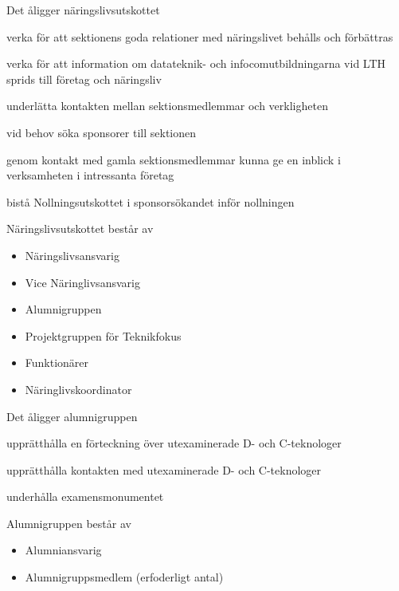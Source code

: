 \documentclass[pdfbookmarks,a4paper,11pt]{article}
\newlength{\itemcollength}
\newenvironment{reglemlista}{%
  \begin{list}{}{%
      \setlength{\labelwidth}{\itemcollength}%
      \setlength{\leftmargin}{\labelwidth + \labelsep}%
      \renewcommand{\makelabel}[1]{%
        \raisebox{0pt}[1ex][0pt]{%
          \makebox[\labelwidth][l]{%
            \parbox[t]{\itemcollength}{%
              \raggedright\hspace{0pt}##1}}}\hfill}%
      }}{%
  \end{list}}
\begin{document}
\begin{reglemlista}

	\item[Åligganden]
	Det åligger näringslivsutskottet
	\begin{attlista}
		\item verka för att sektionens goda relationer med näringslivet behålls och förbättras
		\item verka för att information om datateknik- och infocomutbildningarna vid LTH sprids till företag och näringsliv
		\item underlätta kontakten mellan sektionsmedlemmar och verkligheten
		\item vid behov söka sponsorer till sektionen
		\item genom kontakt med gamla sektionsmedlemmar kunna ge en inblick i verksamheten i intressanta företag
		\item bistå Nollningsutskottet i sponsorsökandet inför nollningen
	\end{attlista}

	\item[Sammansättning]
	Näringslivsutskottet består av
	\begin{itemize}
		\item Näringslivsansvarig
		\item Vice Näringlivsansvarig
		\item Alumnigruppen
		\item Projektgruppen för Teknikfokus
		\item Funktionärer
        \item Näringlivskoordinator
	\end{itemize}

	\item[\textbf{Alumnigruppen}]

	\item[Åligganden]
	Det åligger alumnigruppen
	\begin{attlista}
		\item  upprätthålla en förteckning över utexaminerade D- och C-teknologer
		\item upprätthålla kontakten med utexaminerade D- och C-teknologer
		\item underhålla examensmonumentet
	\end{attlista}

	\item[Sammansättning]
	Alumnigruppen består av
	\begin{itemize}
		\item Alumniansvarig
		\item Alumnigruppsmedlem (erfoderligt antal)
	\end{itemize}

\end{reglemlista}
\end{document}
